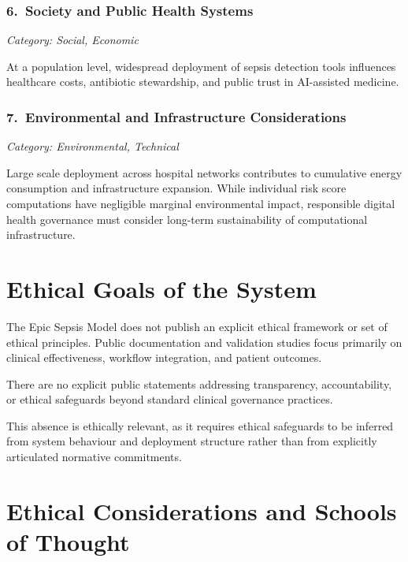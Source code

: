 \documentclass[]{UCD_CS_41820_Report}
\begin{document}
\subsubsection*{6.\ Society and Public Health Systems}
\textit{Category: Social, Economic}

At a population level, widespread deployment of sepsis detection tools influences
healthcare costs, antibiotic stewardship, and public trust in AI-assisted medicine.

\subsubsection*{7.\ Environmental and Infrastructure Considerations}
\textit{Category: Environmental, Technical}

Large scale deployment across hospital networks contributes to cumulative energy
consumption and infrastructure expansion. While individual risk score computations
have negligible marginal environmental impact, responsible digital health governance
must consider long-term sustainability of computational infrastructure.

\section{Ethical Goals of the System}

The Epic Sepsis Model does not publish an explicit ethical framework or set of
ethical principles. Public documentation and validation studies focus primarily
on clinical effectiveness, workflow integration, and patient outcomes.

There are no explicit public statements addressing transparency, accountability,
or ethical safeguards beyond standard clinical governance practices.

This absence is ethically relevant, as it requires ethical safeguards to be inferred
from system behaviour and deployment structure rather than from explicitly articulated
normative commitments.

\section{Ethical Considerations and Schools of Thought}
\end{document}
